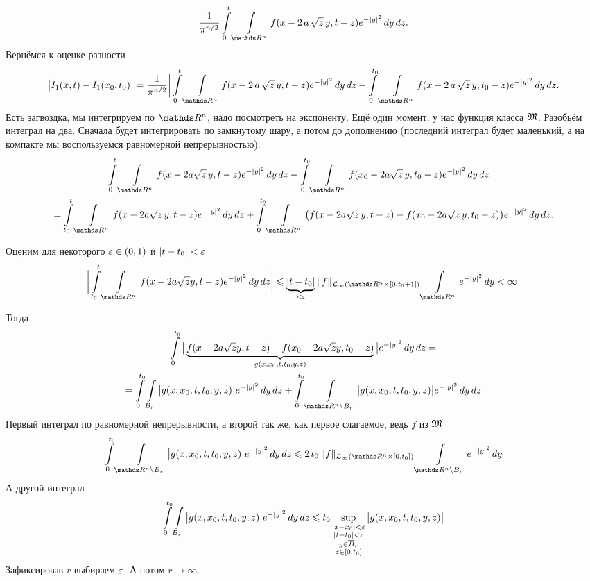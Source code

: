 \begin{Proof}
\begin{multline*}
   \frac1{\pi^{n/2}}\int\limits_0^t \Gint{\R^n}f(x-2\,a\,\sqrt z\,y,t-z)e^{-|y|^2}\,dy\,dz.
\end{multline*}
Вернёмся к оценке разности
\[
   \big|I_1(x,t)-I_1(x_0,t_0)\big| = 
   \frac1{\pi^{n/2}}\bigg|
   \int\limits_0^t \Gint{\R^n}f(x-2\,a\,\sqrt z\,y,t-z)e^{-|y|^2}\,dy\,dz - 
   \int\limits_0^{t_0} \Gint{\R^n}f(x-2\,a\,\sqrt z\,y,t_0-z)e^{-|y|^2}\,dy\,dz.
\]
  Есть загвоздка, мы интегрируем по $\R^n$, надо посмотреть на экспоненту. Ещё один момент, у нас функция класса $\mathfrak M$. Разобьём интеграл на два. Сначала будет интегрировать по замкнутому шару, а потом до дополнению (последний интеграл будет маленький, а на компакте мы воспользуемся равномерной непрерывностью). 
\begin{multline*}
\int\limits_0^t \Gint{\R^n}f(x-2a\sqrt z\,y,t-z)e^{-|y|^2}\,dy\,dz -
\int\limits_0^{t_0} \Gint{\R^n}f(x_0-2a\sqrt z\,y,t_0-z)e^{-|y|^2}\,dy\,dz=\\
=
\int\limits_{t_0}^t \Gint{\R^n}f(x-2a\sqrt z\,y,t-z)e^{-|y|^2}\,dy\,dz +
\int\limits_{0}^{t_0} \Gint{\R^n}
  \big(f(x-2a\sqrt z\,y,t-z)-f(x_0-2a\sqrt z\,y,t_0-z)\big)e^{-|y|^2}\,dy\,dz.
\end{multline*}

Оценим для некоторого $\varepsilon\in(0,1)$ и $|t-t_0|<\varepsilon$
\[
  \bigg|\int\limits_{t_0}^t\Gint{\R^n}f(x-2a\sqrt zy,t-z)e^{-|y|^2}\,dy\,dz\bigg|\le\underbrace{|t-t_0|}_{<\e}\|f\|_{\L_{\infty}(\R^n\times[0,t_0+1])}\Gint{\R^n}e^{-|y|^2}\,dy<\infty\
\]

Тогда
\begin{multline*}
  \int\limits_0^{t_0}\big|\underbrace{f(x-2a\sqrt z y,t-z)-f(x_0-2a\sqrt z y,t_0-z)}_{g(x,x_0,t,t_0,y,z)}\big|e^{-|y|^2}\,dy\,dz = \\ =
  \int\limits_0^{t_0}\Gint{B_r}\big|g(x,x_0,t,t_0,y,z)\big|e^{-|y|^2}\,dy\,dz + 
  \int\limits_0^{t_0}\Gint{\R^n\dd B_r}\big|g(x,x_0,t,t_0,y,z)\big|e^{-|y|^2}\,dy\,dz
\end{multline*}
Первый интеграл по равномерной непрерывности, а второй так же, как первое слагаемое, ведь $f$ из $\mathfrak M$
  \[\int\limits_0^{t_0}\Gint{\R^n\dd B_r}\big|g(x,x_0,t,t_0,y,z)\big|e^{-|y|^2}\,dy\,dz\le
  2\,t_0\,\|f\|_{\L_\infty\left(\R^n\times[0,t_0]\right)}\Gint{\R^n\dd B_r}e^{-|y|^2}\,dy
\]
А другой интеграл
\[
  \int\limits_0^{t_0}\int\limits_{B_r}\big|g(x,x_0,t,t_0,y,z)\big|e^{-|y|^2}\,dy\,dz\leqslant
 t_0\sup\limits_{\substack{|x-x_0|<\varepsilon\\|t-t_0|<\varepsilon\\y\in \overline{B}_r\\ z\in[0,t_0]}} \big|g(x,x_0,t,t_0,y,z)\big|
\]
Зафиксировав $r$ выбираем $\varepsilon$. А потом $r\to\infty$.
\end{Proof}

